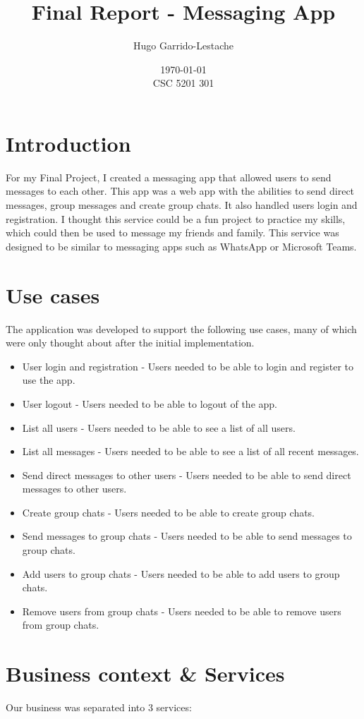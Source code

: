 \documentclass[12pt]{Article}
\title{Final Report - Messaging App}
\author{
    Hugo Garrido-Lestache
}
\date{\today \\ CSC 5201 301}
\begin{document}
\maketitle
\section*{Introduction}
For my Final Project, I created a messaging app that allowed users to send messages to each other.
This app was a web app with the abilities to send direct messages, group messages and create group chats.
It also handled users login and registration.
I thought this service could be a fun project to practice my skills, 
which could then be used to message my friends and family.
This service was designed to be similar to messaging apps such as WhatsApp or Microsoft Teams.

\section{Use cases}
The application was developed to support the following use cases, many of which were only thought about after the initial implementation.

\begin{itemize}
    \item User login and registration - Users needed to be able to login and register to use the app.
    \item User logout - Users needed to be able to logout of the app.
    \item List all users - Users needed to be able to see a list of all users.
    \item List all messages - Users needed to be able to see a list of all recent messages.
    \item Send direct messages to other users - Users needed to be able to send direct messages to other users.
    \item Create group chats - Users needed to be able to create group chats.
    \item Send messages to group chats - Users needed to be able to send messages to group chats.
    \item Add users to group chats - Users needed to be able to add users to group chats.
    \item Remove users from group chats - Users needed to be able to remove users from group chats.
\end{itemize}

\section{Business context \& Services}
Our business was separated into 3 services:
\end{document}
